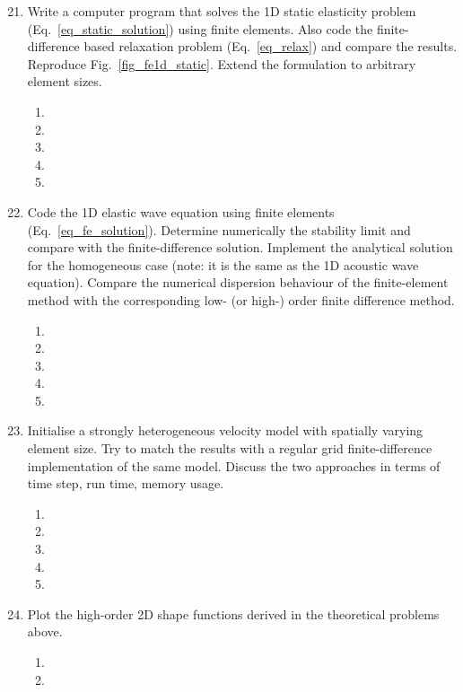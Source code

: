 \begin{enumerate}
\setcounter{enumi}{20}
\item
Write a computer program that solves the 1D static elasticity problem (Eq.~\ref{eq_static_solution}) using finite elements. Also code the finite-difference based relaxation problem (Eq.~\ref{eq_relax}) and compare the results. Reproduce Fig.~\ref{fig_fe1d_static}. Extend the formulation to arbitrary element sizes.
\begin{enumerate}
\item[]
\item[]
\item[] 
\item[]
\item[] 
\end{enumerate}
\item
Code the 1D elastic wave equation using finite elements (Eq.~\ref{eq_fe_solution}).  Determine numerically the stability limit and compare with the finite-difference solution. 
Implement the analytical solution for the homogeneous case (note: it is  the same as the 1D acoustic wave equation). Compare the numerical dispersion behaviour of the finite-element method with the corresponding low- (or high-) order finite difference method.
\begin{enumerate}
\item[]
\item[]
\item[] 
\item[]
\item[] 
\end{enumerate}
\item
Initialise a strongly heterogeneous velocity model with spatially varying element size. Try to match the results with a regular grid finite-difference implementation of the same model. Discuss the two approaches in terms of time step, run time, memory usage. 
\begin{enumerate}
\item[]
\item[]
\item[] 
\item[]
\item[] 
\end{enumerate}
\item
Plot the high-order 2D shape functions derived in the theoretical problems above.  
\begin{enumerate}
\item[]
\item[]

\end{enumerate}
\end{enumerate}
